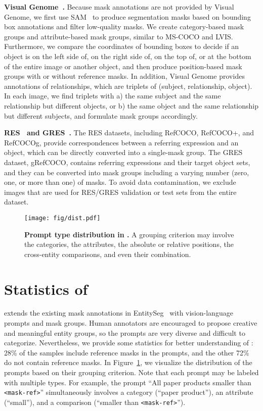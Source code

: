 \noindent\textbf{Visual Genome~\cite{krishna2017visual}.} Because mask annotations are not provided by Visual Genome, we first use SAM~\cite{kirillov2023segment} to produce segmentation masks based on bounding box annotations and filter low-quality masks. We create category-based mask groups and attribute-based mask groups, similar to MS-COCO and LVIS. Furthermore, we compare the coordinates of bounding boxes to decide if an object is on the left side of, on the right side of, on the top of, or at the bottom of the entire image or another object, and then produce position-based mask groups with or without reference masks. In addition, Visual Genome provides annotations of relationships, which are triplets of (subject, relationship, object). In each image, we find triplets with a) the same subject and the same relationship but different objects, or b) the same object and the same relationship but different subjects, and formulate mask groups accordingly.

\noindent\textbf{RES~\cite{yu2016modeling} and GRES~\cite{liu2023gres}.} The RES datasets, including RefCOCO, RefCOCO+, and RefCOCOg, provide correspondences between a referring expression and an object, which can be directly converted into a single-mask group. The GRES dataset, gRefCOCO, contains referring expressions and their target object sets, and they can be converted into mask groups including a varying number (zero, one, or more than one) of masks. To avoid data contamination, we exclude images that are used for RES/GRES validation or test sets from the entire \ourlargedata dataset.

\begin{figure}[th]
    \centering
    \texttt{[image: fig/dist.pdf]}
    \caption{\textbf{Prompt type distribution in \ourgooddata.} A grouping criterion may involve the categories, the attributes, the absolute or relative positions, the cross-entity comparisons, and even their combination.}
    \label{fig:ourgooddata}
\end{figure}

\section{Statistics of \ourgooddata}
\label{sec:supp-ourgooddata}
\ourgooddata extends the existing mask annotations in EntitySeg~\cite{qi2023high} with vision-language prompts and mask groups. Human annotators are encouraged to propose creative and meaningful entity groups, so the prompts are very diverse and difficult to categorize. Nevertheless, we provide some statistics for better understanding of \ourgooddata: 28\% of the samples include reference masks in the prompts, and the other 72\% do not contain reference masks. In Figure~\ref{fig:ourgooddata}, we visualize the distribution of the prompts based on their grouping criterion. Note that each prompt may be labeled with multiple types. For example, the prompt ``All paper products smaller than \texttt{\textless mask-ref\textgreater}'' simultaneously involves a category (``paper product''), an attribute (``small''), and a comparison (``smaller than \texttt{\textless mask-ref\textgreater}'').

